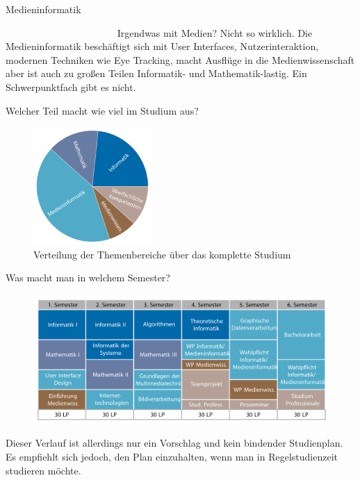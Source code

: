 	\begin{Huge}
			Medieninformatik
		\end{Huge}
		\begin{exampleblock}{\textcolor{white}{Was ist der Studiengang?}}
			Irgendwas mit Medien? Nicht so wirklich. Die Medieninformatik beschäftigt sich mit User Interfaces, Nutzerinteraktion, modernen Techniken wie Eye Tracking, macht Ausflüge in die Medienwissenschaft aber ist auch zu großen Teilen Informatik- und Mathematik-lastig. Ein Schwerpunktfach gibt es nicht.
		\end{exampleblock}
	
	\begin{block}{Welcher Teil macht wie viel im Studium aus?}
		\begin{figure}[h!]
			\includegraphics[width=0.4\textwidth]{charts/medieninformatik-Piechart.pdf}
			\caption{Verteilung der Themenbereiche über das komplette Studium}
		\end{figure}
	\end{block}
	
	\begin{block}{Was macht man in welchem Semester?}
		\begin{figure}[h!]
			\includegraphics[width=\textwidth]{charts/medieninformatik-Studienplan_abWS18.pdf}
		\end{figure}
		Dieser Verlauf ist allerdings nur ein Vorschlag und kein bindender Studienplan. Es empfiehlt sich jedoch, den Plan einzuhalten, wenn man in Regelstudienzeit studieren möchte.
	\end{block}
